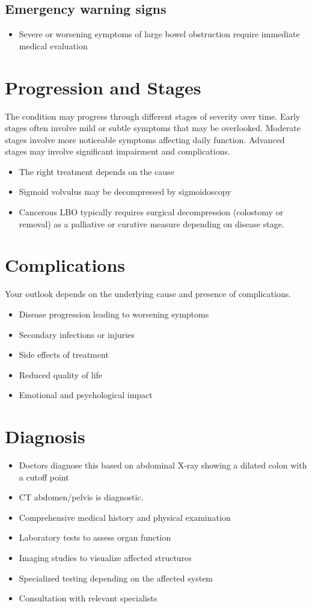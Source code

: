 \subsection{Emergency warning signs}
\begin{itemize}[noitemsep]
  \item Severe or worsening symptoms of large bowel obstruction require immediate medical evaluation
\end{itemize}
\section{Progression and Stages}
The condition may progress through different stages of severity over time. Early stages often involve mild or subtle symptoms that may be overlooked. Moderate stages involve more noticeable symptoms affecting daily function. Advanced stages may involve significant impairment and complications.

\begin{itemize}[noitemsep]
  \item The right treatment depends on the cause
  \item Sigmoid volvulus may be decompressed by sigmoidoscopy
  \item Cancerous LBO typically requires surgical decompression (colostomy or removal) as a palliative or curative measure depending on disease stage.
\end{itemize}
\section{Complications}
Your outlook depends on the underlying cause and presence of complications.

\begin{itemize}[noitemsep]
  \item Disease progression leading to worsening symptoms
  \item Secondary infections or injuries
  \item Side effects of treatment
  \item Reduced quality of life
  \item Emotional and psychological impact
\end{itemize}
\section{Diagnosis}
\begin{itemize}[noitemsep]
  \item Doctors diagnose this based on abdominal X-ray showing a dilated colon with a cutoff point
  \item CT abdomen/pelvis is diagnostic.
  \item Comprehensive medical history and physical examination
  \item Laboratory tests to assess organ function
  \item Imaging studies to visualize affected structures
  \item Specialized testing depending on the affected system
  \item Consultation with relevant specialists
\end{itemize}
